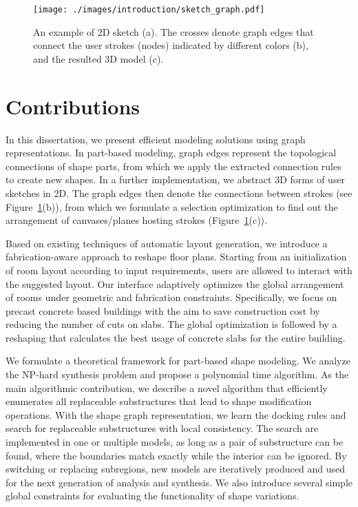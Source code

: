 \begin{figure}[t!]
  \texttt{[image: ./images/introduction/sketch\_graph.pdf]}
  \caption{An example of 2D sketch (a). The crosses denote graph edges that connect the user strokes (nodes) indicated by different colors (b), and the resulted 3D model (c).}
  \label{fig:intro_sketch_graph}
\end{figure}

\section{Contributions}

In this dissertation, we present efficient modeling solutions using graph representations. In part-based modeling, graph edges represent the topological connections of shape parts, from which we apply the extracted connection rules to create new shapes. In a further implementation, we abstract 3D forms of user sketches in 2D. The graph edges then denote the connections between strokes (see Figure~\ref{fig:intro_sketch_graph}(b)), from which we formulate a selection optimization to find out the arrangement of canvases/planes hosting strokes (Figure~\ref{fig:intro_sketch_graph}(c)).

Based on existing techniques of automatic layout generation, we introduce a fabrication-aware approach to reshape floor plans. Starting from an initialization of room layout according to input requirements, users are allowed to interact with the suggested layout. Our interface adaptively optimizes the global arrangement of rooms under geometric and fabrication constraints. Specifically, we focus on precast concrete based buildings with the aim to save construction cost by reducing the number of cuts on slabs. The global optimization is followed by a reshaping that calculates the best usage of concrete slabs for the entire building.

We formulate a theoretical framework for part-based shape modeling. We analyze the NP-hard synthesis problem and propose a polynomial time algorithm. As the main algorithmic contribution, we describe a novel algorithm that efficiently enumerates all replaceable substructures that lead to shape modification operations. With the shape graph representation, we learn the docking rules and search for replaceable substructures with local consistency. The search are implemented in one or multiple models, as long as a pair of substructure can be found, where the boundaries match exactly while the interior can be ignored. By switching or replacing subregions, new models are iteratively produced and used for the next generation of analysis and synthesis. We also introduce several simple global constraints for evaluating the functionality of shape variations.

